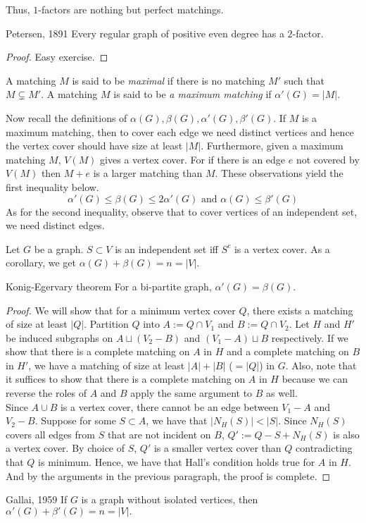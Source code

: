 \documentclass[../basic_graph_theory.tex]{subfiles}
\begin{document}
Thus, $1$-factors are nothing but perfect matchings.

\begin{Thm}{Petersen, 1891}{}
    Every regular graph of positive even degree has a $2$-factor.
\end{Thm}
\begin{proof}
    Easy exercise.
\end{proof}

A matching $M$ is said to be {\em maximal} if there is no matching $M'$ such that $M \subsetneq M'$.  A matching $M$ is said to be {\em a maximum matching} if $\alpha'(G) = |M|$.

Now recall the definitions of $\alpha(G), \beta(G), \alpha'(G), \beta'(G)$. If $M$ is a maximum matching, then to cover each edge we need distinct vertices and hence the vertex cover should have size at least $|M|$.  Furthermore,  given a maximum matching $M$,   $V(M)$ gives a vertex cover.   For if there is an edge $e$ not covered by $V(M)$ then $M+e$ is a larger matching than $M$.  These observations yield the first inequality below.
\[
    \alpha'(G) \leq  \beta(G) \leq 2 \alpha'(G) \text{ and } \alpha(G) \leq \beta'(G)
\]
As for the second inequality, observe that to cover vertices of an independent set, we need distinct edges.

\begin{lem}
    Let $G$ be a graph. $S \subset V$ is an independent set iff $S^c$ is a vertex cover. As a corollary, we get $\alpha(G) + \beta(G) = n = |V|.$
\end{lem}
\begin{Thm}{Konig-Egervary theorem}{} 
    For a bi-partite graph, $\alpha'(G) = \beta(G)$.
\end{Thm}
\begin{proof}
    We will show that for a minimum vertex cover $Q$, there exists a matching of size at least $|Q|$. Partition $Q$ into $A := Q \cap V_1$ and $B := Q \cap V_2$. Let $H$ and $H'$ be induced subgraphs on $A \sqcup (V_2 - B)$ and $(V_1 - A) \sqcup B$ respectively. If we show that there is a complete matching on $A$ in $H$ and a complete matching on $B$ in $H'$, we have a matching of size at least $|A| + |B|$ ($= |Q|$) in $G$.  Also, note that it suffices to show that there is a complete matching on $A$ in $H$ because we can reverse the roles of $A$ and $B$ apply the same argument to $B$ as well. \\
    Since $A \cup B$ is a vertex cover, there cannot be an edge between $V_1 - A$ and $V_2 - B$. Suppose for some $S \subset A$, we have that $|N_H(S)| < |S|$. Since $N_H(S)$ covers all edges from $S$ that are not incident on $B$, $Q' := Q - S + N_H(S)$ is also a vertex cover. By choice of $S$, $Q'$ is a smaller vertex cover than $Q$ contradicting that $Q$ is minimum.  Hence, we have that Hall's condition holds true for $A$ in $H$. And by the arguments in the previous paragraph, the proof is complete.
\end{proof}
\begin{Thm}{Gallai, 1959}{} 
    If $G$ is a graph without isolated vertices, then $\alpha'(G) + \beta'(G) = n = |V|.$
\end{Thm}
\end{document}
